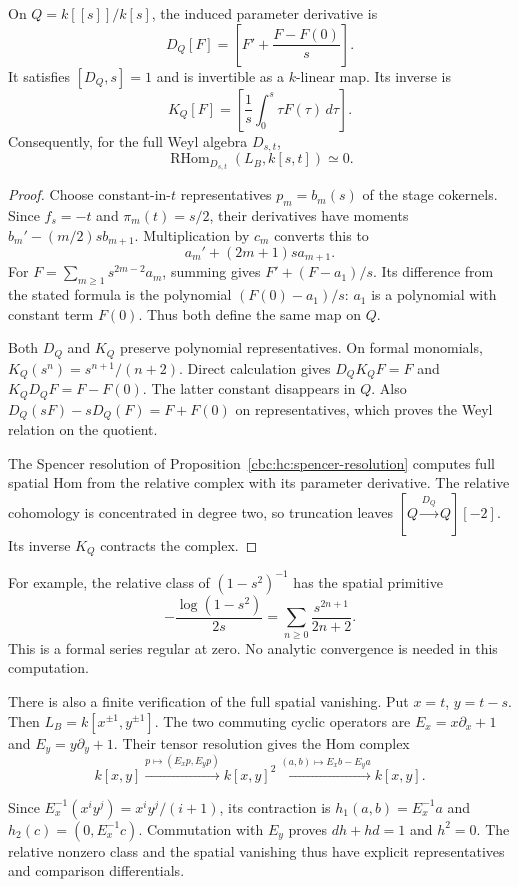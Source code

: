 \begin{theorem}\label{cbc:ac:quotient-connection}
On $Q=k[[s]]/k[s]$, the induced parameter derivative is
\[
 D_Q[F]=\left[F'+\frac{F-F(0)}s\right].
\]
It satisfies $[D_Q,s]=1$ and is invertible as a
$k$-linear map. Its inverse is
\[
 K_Q[F]=\left[\frac1s\int_0^s\tau F(\tau)\,d\tau\right].
\]
Consequently, for the full Weyl algebra $D_{s,t}$,
\[
 \operatorname{RHom}_{D_{s,t}}(L_B,k[s,t])\simeq0.
\]
\end{theorem}
\begin{proof}
Choose constant-in-$t$ representatives $p_m=b_m(s)$
of the stage cokernels. Since $f_s=-t$ and
$\pi_m(t)=s/2$, their derivatives have moments
$b_m'-(m/2)s b_{m+1}$.
Multiplication by $c_m$ converts this to
\[
 a_m'+(2m+1)s a_{m+1}.
\]
For $F=\sum_{m\geq1}s^{2m-2}a_m$, summing gives
$F'+(F-a_1)/s$. Its difference from the stated
formula is the polynomial $(F(0)-a_1)/s$:
$a_1$ is a polynomial with constant term $F(0)$.
Thus both define the same map on $Q$.

Both $D_Q$ and $K_Q$ preserve polynomial
representatives. On formal monomials,
$K_Q(s^n)=s^{n+1}/(n+2)$.
Direct calculation gives
$D_QK_QF=F$ and $K_QD_QF=F-F(0)$.
The latter constant disappears in $Q$.
Also $D_Q(sF)-sD_Q(F)=F+F(0)$ on representatives,
which proves the Weyl relation on the quotient.

The Spencer resolution of
Proposition~\ref{cbc:hc:spencer-resolution} computes
full spatial Hom from the relative complex with
its parameter derivative. The relative cohomology
is concentrated in degree two, so truncation leaves
$[Q\xrightarrow{D_Q}Q][-2]$.
Its inverse $K_Q$ contracts the complex.
\end{proof}

For example, the relative class of $(1-s^2)^{-1}$
has the spatial primitive
\[
 -\frac{\log(1-s^2)}{2s}
     =\sum_{n\geq0}\frac{s^{2n+1}}{2n+2}.
\]
This is a formal series regular at zero.
No analytic convergence is needed in this computation.

There is also a finite verification of the full
spatial vanishing. Put $x=t$, $y=t-s$.
Then $L_B=k[x^{\pm1},y^{\pm1}]$. The two commuting
cyclic operators are $E_x=x\partial_x+1$ and
$E_y=y\partial_y+1$. Their tensor resolution gives
the Hom complex
\[
 k[x,y]\xrightarrow{p\mapsto(E_xp,E_yp)}k[x,y]^2
       \xrightarrow{(a,b)\mapsto E_xb-E_ya}k[x,y].
\]

Since $E_x^{-1}(x^iy^j)=x^iy^j/(i+1)$, its
contraction is
$h_1(a,b)=E_x^{-1}a$ and
$h_2(c)=(0,E_x^{-1}c)$.
Commutation with $E_y$ proves $dh+hd=1$ and
$h^2=0$. The relative nonzero class and the
spatial vanishing thus have explicit representatives
and comparison differentials.

